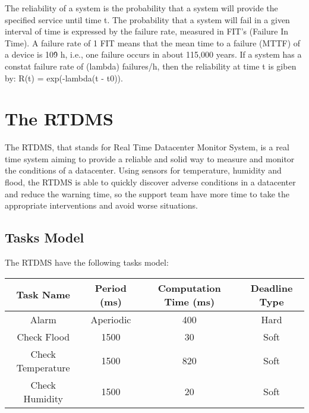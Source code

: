 \documentclass[12pt]{article}
\begin{document}
The reliability of a system is the probability that a system will provide the specified service until time t.
The probability that a system will fail in a given interval of time is expressed by the failure rate, 
measured in FIT's (Failure In Time). A failure rate of 1 FIT means that the mean time to a failure (MTTF) 
of a device is 10\^9 h, i.e., one failure occurs in about 115,000 years.
If a system has a constat failure rate of (lambda) failures/h, then the reliability at time t is giben by:
R(t) = exp(-lambda(t - t0)). \cite{kopetz2011real}

\fi

\section{The RTDMS}

The RTDMS, that stands for Real Time Datacenter Monitor System, is a real time system aiming
to provide a reliable and solid way to measure and monitor the conditions of a datacenter. Using
sensors for temperature, humidity and flood, the RTDMS is able to quickly discover adverse conditions
in a datacenter and reduce the warning time, so the support team have more time to take the
appropriate interventions and avoid worse situations.

\subsection{Tasks Model}
The RTDMS have the following tasks model:

\begin{table}[H]
    \begin{tabular}{|c|c|c|c|}
        \hline
        \textbf{Task Name}& \textbf{Period (ms)}& \textbf{Computation Time (ms)}& \textbf{Deadline Type} \\ \hline
        Alarm             & Aperiodic   & 400                   & Hard          \\ \hline
        Check Flood       & 1500        & 30                    & Soft          \\ \hline
        Check Temperature & 1500        & 820                   & Soft          \\ \hline
        Check Humidity    & 1500        & 20                    & Soft          \\
        \hline
    \end{tabular}
\end{table}
\end{document}
